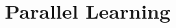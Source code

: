 \documentclass[../mthe-493-final-project.tex]{subfiles}
\begin{document}

    \section{Parallel Learning}
    \label{sec:parallel-learning}
\end{document}
